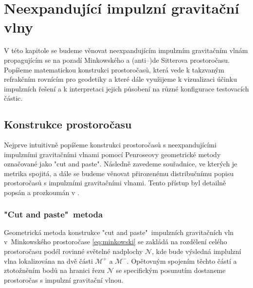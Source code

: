 \chapter{Neexpandující impulzní gravitační vlny}
\label{chap:kap02}
V této kapitole se budeme věnovat neexpandujícím impulzním gravitačním vlnám propagujícím se na pozadí Minkowského a (anti--)de Sitterova
prostoročasu. Popíšeme matematickou konstrukci prostoročasů, která vede k takzvaným refrakčním rovnícím pro geodetiky a které dále využijeme k vizualizaci účinku
impulzních řešení a k interpretaci jejich působení na různé konfigurace testovacích částic.


\section{Konstrukce prostoročasu}
Nejprve intuitivně popíšeme konstrukci prostoročasů s neexpandujícími impulzními gravitačními vlnami
pomocí Penroseovy geometrické metody \cite{Penrose:1972xrn} označované jako "cut and paste". Následně zavedeme souřadnice, ve
kterých je metrika spojitá, a dále se budeme věnovat přirozenému distribučnímu popisu prostoročasů s impulzními gravitačními
vlnami. Tento přístup byl detailně popsán a prozkoumán v \cite{Podolsky:2014ysa}.

\subsection{"Cut and paste"\ metoda}
\label{sec:cut_and_paste_konstrukce1}
Geometrická metoda konstrukce "cut and paste"\ impulzních gravitačních vln v~Minkowského prostoročase \eqref{eq:minkowski} se zakládá na rozdělení celého prostoročasu podél rovinné
světelné nadplochy $\mathcal{N}$, kde bude výsledná implulzní vlna lokalizována na dvě části $\mathcal{M}^+$ a $\mathcal{M}^-$. Opětovným spojením těchto částí a ztotožněním bodů na hranici
řezu $\mathcal{N}$ se specifickým posunutím dostaneme prostoročas s impulzní gravitační vlnou.

